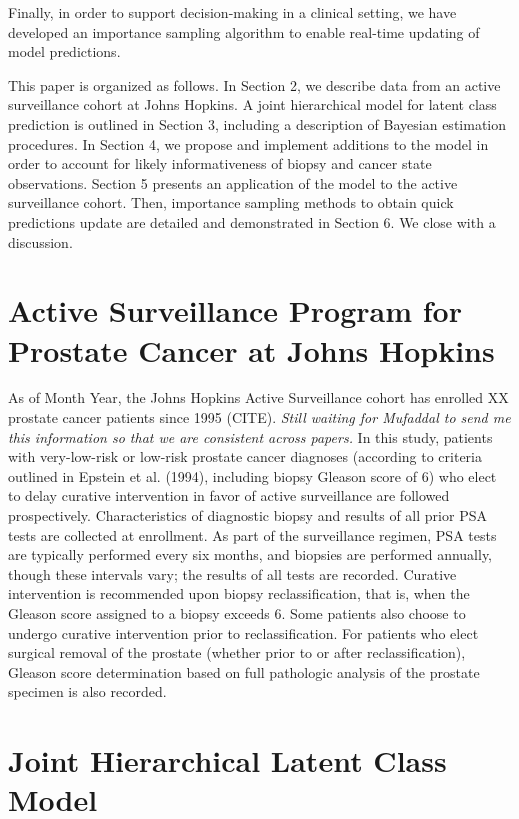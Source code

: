 \documentclass[12pt, letterpaper]{article}
\begin{document}
Finally, in order to support decision-making in a clinical setting, we have developed an importance sampling algorithm to enable real-time updating of model predictions\cite{Geweke1989}. 


This paper is organized as follows. In Section 2, we describe data from an active surveillance cohort at Johns Hopkins. A joint hierarchical model for latent class prediction is outlined in Section 3, including a description of Bayesian estimation procedures. In Section 4, we propose and implement additions to the model in order to account for likely informativeness of biopsy and cancer state observations. Section 5 presents an application of the model to the active surveillance cohort. Then, importance sampling methods to obtain quick predictions update are detailed and demonstrated in Section 6. We close with a discussion.


\section{Active Surveillance Program for Prostate Cancer at Johns Hopkins}
As of Month Year, the Johns Hopkins Active Surveillance cohort has enrolled XX prostate cancer patients since 1995 (CITE). \textit{Still waiting for Mufaddal to send me this information so that we are consistent across papers.} In this study, patients with very-low-risk or low-risk prostate cancer diagnoses (according to criteria outlined in Epstein et al. (1994)\nocite{Epstein1994}, including biopsy Gleason score of 6) who elect to delay curative intervention in favor of active surveillance are followed prospectively. Characteristics of diagnostic biopsy and results of all prior PSA tests are collected at enrollment. As part of the surveillance regimen, PSA tests are typically performed every six months, and biopsies are performed annually, though these intervals vary; the results of all tests are recorded. Curative intervention is recommended upon biopsy reclassification, that is, when the Gleason score assigned to a biopsy exceeds 6. Some patients also choose to undergo curative intervention prior to reclassification. For patients who elect surgical removal of the prostate (whether prior to or after reclassification), Gleason score determination based on full pathologic analysis of the prostate specimen is also recorded.

\section{Joint Hierarchical Latent Class Model}
\end{document}
